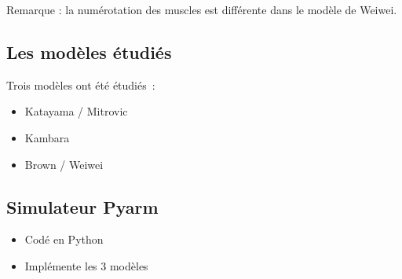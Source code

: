 \documentclass[pdftex,a4paper,11pt]{article}
\begin{document}
Remarque : la numérotation des muscles est différente dans le modèle de Weiwei.

\subsection{Les modèles étudiés}
Trois modèles ont été étudiés~:
\begin{itemize}
    \item Katayama / Mitrovic
    \item Kambara
    \item Brown / Weiwei
\end{itemize}

\subsection{Simulateur Pyarm}

\begin{itemize}
    \item Codé en Python
    \item Implémente les 3 modèles
\end{itemize}

\begin{figure}
    \centering
    ~~~
    ~~~
\end{figure}
\end{document}

